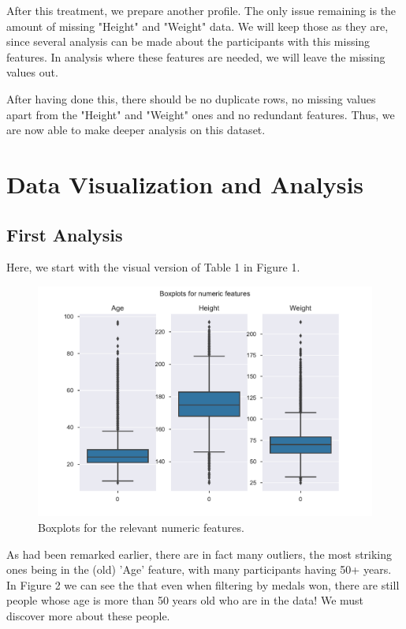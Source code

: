 \documentclass[11pt]{article} %
\begin{document}
After this treatment, we prepare another profile. The only issue remaining is the amount of missing "Height" and "Weight" data. We will keep those as they are, since several analysis can be made about the participants with this missing features. In analysis where these features are needed, we will leave the missing values out.

After having done this, there should be no duplicate rows, no missing values apart from the "Height" and "Weight" ones and no redundant features. Thus, we are now able to make deeper analysis on this dataset.



\section{Data Visualization and Analysis}

\subsection{First Analysis}

Here, we start with the visual version of Table 1 in Figure 1.

\begin{figure}
    \centering
    \includegraphics[scale=0.6]{Boxplot_numeric.pdf}
    \caption{Boxplots for the relevant numeric features.}
\end{figure}

As had been remarked earlier, there are in fact many outliers, the most striking ones being in the (old) 'Age' feature, with many participants having 50+ years. In Figure 2 we can see the that even when filtering by medals won, there are still people whose age is more than 50 years old who are in the data! We must discover more about these people.
\end{document}
